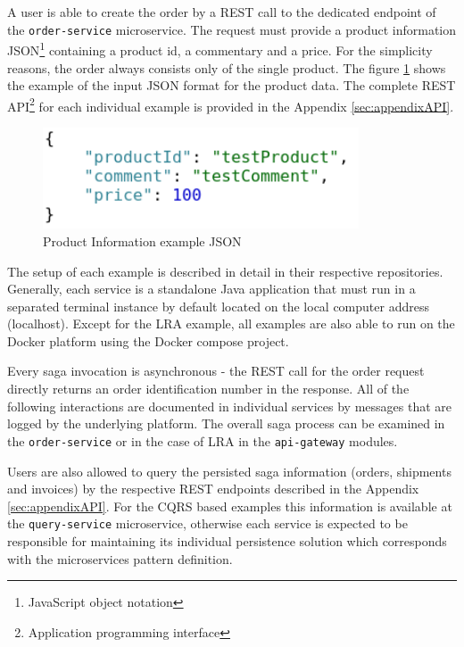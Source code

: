 \documentclass[oneside,
  digital, %
  table,   %
  nolof,     %
  nolot,     %
]{fithesis3}
\begin{document}
A user is able to create the order by a REST call to the dedicated endpoint of the \texttt{order-service} microservice. The request must provide a product information JSON\footnote{JavaScript object notation} containing a product id, a commentary and a price. For the simplicity reasons, the order always consists only of the single product. The figure \ref{fig:inputJson} shows the example of the input JSON format for the product data. The complete REST API\footnote{Application programming interface} for each individual example is provided in the Appendix \ref{sec:appendixAPI}.

\begin{figure}
    \begin{center}
        \includegraphics[height=30mm]{images/productInfoJSON.png}
    \end{center}
    \caption{Product Information example JSON}
    \label{fig:inputJson}
\end{figure}

The setup of each example is described in detail in their respective repositories. Generally, each service is a standalone Java application that must run in a separated terminal instance by default located on the local computer address (localhost). Except for the LRA example, all examples are also able to run on the Docker\cite{docker} platform using the Docker compose project\cite{docker_compose}.

Every saga invocation is asynchronous - the REST call for the order request directly returns an order identification number in the response. All of the following interactions are documented in individual services by messages that are logged by the underlying platform. The overall saga process can be examined in the \texttt{order-service} or in the case of LRA in the \texttt{api-gateway} modules.

Users are also allowed to query the persisted saga information (orders, shipments and invoices) by the respective REST endpoints described in the Appendix \ref{sec:appendixAPI}. For the CQRS based examples this information is available at the \texttt{query-service} microservice, otherwise each service is expected to be responsible for maintaining its individual persistence solution which corresponds with the microservices pattern definition.
\end{document}

